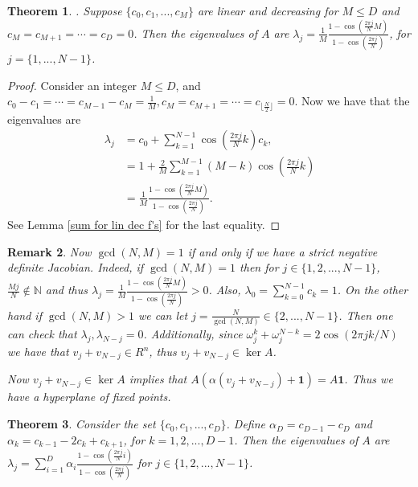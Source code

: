 \documentclass{article}
\newcommand{\N}{\mathbb{N}}
\newtheorem{thm}{Theorem}[section]
\newtheorem{rmk}[thm]{Remark}
\newcommand{\1}{\mathbf{1}}
\newcommand{\0}{\mathbf{0}}
\begin{document}
\begin{thm} \label{lin dec f's}.
Suppose $\{ c_0,c_1,...,c_M \}$ are linear and decreasing for $M \leq D$ and $c_M = c_{M+1} = \cdots = c_D = 0$.  
Then the eigenvalues of $A$ are $\lambda_j = \frac{1}{M} \frac{1- \cos(\frac{2\pi j}{N} M)}{1- \cos(\frac{2\pi j}{N})}$, for $j = \{ 1,...,N-1 \}$.
\end{thm}

\begin{proof}
Consider an integer $M \leq D$, and  $c_0-c_1= \cdots = c_{M-1} - c_M = \frac 1M, c_M = c_{M+1}= \cdots = c_{\lfloor \frac N2 \rfloor} = 0.$  
Now we have that the eigenvalues are 
\begin{align} \label{}
\lambda_j &= c_0 + \sum_{k=1}^{N-1} \cos(\frac{2\pi j}{N} k) c_k,  \nonumber \\
&= 1 + \frac 2M \sum_{k=1}^{M-1} (M-k)\cos(\frac{2\pi j}{N} k) \nonumber \\
&= \frac{1}{M} \frac{1- \cos(\frac{2\pi j}{N} M)}{1- \cos(\frac{2\pi j}{N})}.
\end{align}
See Lemma \ref{sum for lin dec f's} for the last equality.
\end{proof}

\begin{rmk} \label{rmk:gcd}
Now $\gcd(N,M) = 1$ if and only if we have a strict negative definite Jacobian.  
Indeed, if $\gcd(N,M) = 1$ then for $j \in  \{ 1,2,...,N-1 \}$, $\frac{Mj}{N} \notin \N$ and thus $\lambda_j = \frac{1}{M} \frac{1- \cos(\frac{2\pi j}{N} M)}{1- \cos(\frac{2\pi j}{N})} > 0$.
Also, $\lambda_0 = \sum_{k=0}^{N-1} c_k = 1$.
On the other hand if $\gcd(N,M) > 1$ we can let $j = \frac N{\gcd(N,M)} \in \{2,...,N-1 \}$.
Then one can check that $\lambda_j, \lambda_{N-j} = 0$.
Additionally, since $\omega_j^k +\omega_j^{N-k} = 2\cos(2\pi j k/N)$ we have that $v_j + v_{N-j} \in R^n$, thus $v_j + v_{N-j} \in \ker A$.

Now $v_j + v_{N-j} \in \ker A$ implies that $A (\alpha(v_j + v_{N-j}) + \1) = A \1$. 
Thus we have a hyperplane of fixed points.
\end{rmk}

\begin{thm} \label{e-val_convx_comb}
Consider the set $\{ c_0,c_1,...,c_D \}$.  
Define $\alpha_D = c_{D-1} - c_D$ and $\alpha_k = c_{k-1} - 2c_k +c_{k+1}$, for $k = 1,2,...,D-1$.  
Then the eigenvalues of $A$ are $\lambda_j = \sum_{i=1}^D \alpha_{i} \frac{1- \cos(\frac{2\pi j}{N} i)}{1- \cos(\frac{2\pi j}{N})}$ for $j \in  \{ 1,2,...,N-1 \}$.
\end{thm}
\end{document}
